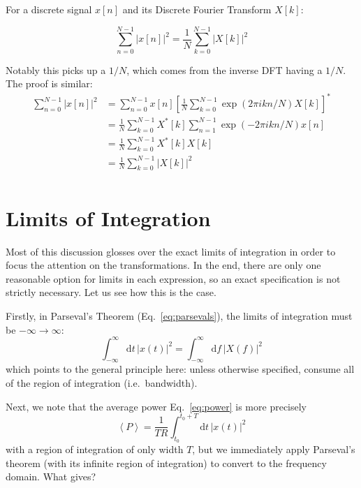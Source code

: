 \documentclass{article}
\newcommand{\dd}[1]{\mathrm{d}#1\,}
\newcommand{\Avg}[1]{\left< #1 \right>}
\begin{document}
For a discrete signal \(x[n]\) and its Discrete Fourier Transform \(X[k]\):

\[ \sum_{n=0}^{N-1} \left|x[n]\right|^2 = \frac{1}{N}\sum_{k=0}^{N-1} \left|X[k]\right|^2 \]

Notably this picks up a \(1/N\), which comes from the inverse DFT having a \(1/N\). 
The proof is similar:
%
\begin{align*}
    \sum_{n=0}^{N-1} \left|x[n]\right|^2 & = \sum_{n=0}^{N-1} x[n] \left[ \frac{1}{N} \sum_{k=0}^{N-1} \exp\left(2\pi ikn/N\right) X[k] \right]^* \\
    & = \frac{1}{N} \sum_{k=0}^{N-1}X^*[k] \sum_{n=1}^{N-1} \exp\left(-2\pi ikn/N\right) x[n] \\
    & = \frac{1}{N} \sum_{k=0}^{N-1}X^*[k] X[k] \\
    & = \frac{1}{N} \sum_{k=0}^{N-1}\left| X[k] \right|^2 \\
\end{align*}

\section{Limits of Integration}\label{appendix:limits}

Most of this discussion glosses over the exact limits of integration in order
to focus the attention on the transformations. In the end, there are only one
reasonable option for limits in each expression, so an exact specification is
not strictly necessary. Let us see how this is the case. 

Firstly, in Parseval's Theorem (Eq.~\eqref{eq:parsevals}), the limits of
integration must be \(-\infty\to\infty\):
%
\begin{equation*}
    \int_{-\infty}^{\infty} \dd{t} \left|x(t)\right|^2 = \int_{-\infty}^{\infty} \dd{f} \left|X(f)\right|^2
\end{equation*}
%
which points to the general principle here: unless otherwise specified, consume
all of the region of integration (i.e.~bandwidth). 

Next, we note that the average power Eq.~\eqref{eq:power} is more precisely
%
\begin{equation}
    \Avg{P} = \frac{1}{TR}\int_{t_0}^{t_0+T} \dd{t} \left|x(t)\right|^2
\end{equation}
%
with a region of integration of only width \(T\), but we immediately apply 
Parseval's theorem (with its infinite region of integration) to convert to
the frequency domain. What gives? 
\end{document}
